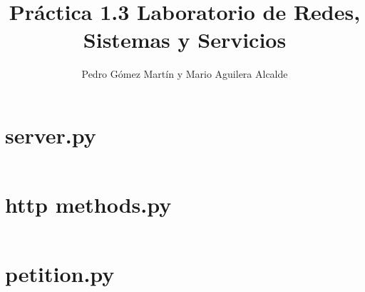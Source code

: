 \documentclass{article}
\title{Práctica 1.3 Laboratorio de Redes, Sistemas y Servicios}
\author{Pedro Gómez Martín y Mario Aguilera Alcalde}
\begin{document}
\maketitle

\section{server.py}
\inputminted{python}{server.py}

\section{http methods.py}
\inputminted{python}{http_methods.py}

\section{petition.py}
\inputminted{python}{petition.py}
\end{document}

